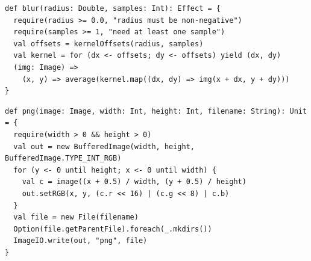 \documentclass[11pt,letterpaper]{article}
\newcommand{\code}[1]{\texttt{#1}}
\begin{document}
\begin{lstlisting}[caption={Box blur: $\texttt{samples}^2$ evaluations of the inner image per output pixel (\code{AiExtension.scala})}]
def blur(radius: Double, samples: Int): Effect = {
  require(radius >= 0.0, "radius must be non-negative")
  require(samples >= 1, "need at least one sample")
  val offsets = kernelOffsets(radius, samples)
  val kernel = for (dx <- offsets; dy <- offsets) yield (dx, dy)
  (img: Image) =>
    (x, y) => average(kernel.map((dx, dy) => img(x + dx, y + dy)))
}
\end{lstlisting}

\begin{lstlisting}[caption={The rendering boundary re-evaluates the whole function for every pixel (\code{Basics.scala})}]
def png(image: Image, width: Int, height: Int, filename: String): Unit = {
  require(width > 0 && height > 0)
  val out = new BufferedImage(width, height, BufferedImage.TYPE_INT_RGB)
  for (y <- 0 until height; x <- 0 until width) {
    val c = image((x + 0.5) / width, (y + 0.5) / height)
    out.setRGB(x, y, (c.r << 16) | (c.g << 8) | c.b)
  }
  val file = new File(filename)
  Option(file.getParentFile).foreach(_.mkdirs())
  ImageIO.write(out, "png", file)
}
\end{lstlisting}
\end{document}

